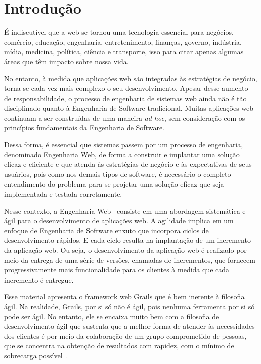 \chapter{Introdução}

É  indiscutível que  a web  se tornou  uma tecnologia  essencial  para negócios,
comércio,  educação, engenharia,  entretenimento, finanças,  governo, indústria,
mídia, medicina, política, ciência e  transporte, isso para citar apenas algumas
áreas que têm impacto sobre nossa vida.

\vspace{0.2cm}

No  entanto,  à medida  que  aplicações web  são  integradas  às estratégias  de
negócio, torna-se  cada vez mais  complexo o seu desenvolvimento.   Apesar desse
aumento de responsabilidade, o processo  de engenharia de sistemas web ainda não
é  tão  disciplinado  quanto  à  Engenharia  de  Software  tradicional.   Muitas
aplicações web  continuam a  ser construídas  de uma maneira  {\it ad  hoc}, sem
consideração com os princípios fundamentais da Engenharia de Software.

\vspace{0.2cm}

Dessa  forma, é essencial  que sistemas  passem por  um processo  de engenharia,
denominado Engenharia Web, de forma a construir e implantar uma solução eficaz e
eficiente  e que  atenda às  estratégias de  negócio e  às expectativas  de seus
usuários,  pois como  nos  demais tipos  de  software, é  necessário o  completo
entendimento  do  problema  para  se   projetar  uma  solução  eficaz  que  seja
implementada e testada corretamente.

\vspace{0.2cm}

Nesse contexto, a  Engenharia Web~\cite{Bed12, Pressman09}
consiste  em  uma  abordagem  sistemática  e  ágil  para  o  desenvolvimento  de
aplicações  web. A agilidade  implica em  um enfoque  de Engenharia  de Software
enxuto que incorpora ciclos de  desenvolvimento rápidos. E cada ciclo resulta na
implantação de  um incremento da aplicação  web.  Ou seja,  o desenvolvimento da
aplicação web é realizado por meio  da entrega de uma série de versões, chamadas
de  incrementos,  que  fornecem  progressivamente mais  funcionalidade  para  os
clientes à medida que cada incremento é entregue.

\vspace{0.2cm}

Esse material  apresenta o framework web  Grails que é bem  inerente à filosofia
ágil. Na realidade, Grails, por si só não é ágil, pois nenhuma ferramenta por si
só  pode ser  ágil. No  entanto, ele  se encaixa  muito bem  com a  filosofia de
desenvolvimento ágil que sustenta que  a melhor forma de atender às necessidades
dos clientes é por meio da  colaboração de um grupo comprometido de pessoas, que
se concentra na  obtenção de resultados com rapidez, com  o mínimo de sobrecarga
possível~\cite{BA04, Schwaber04}.

